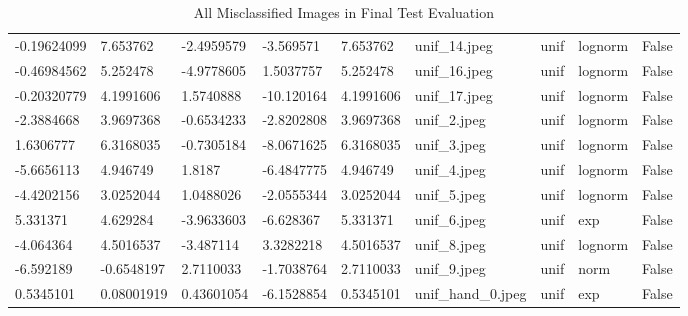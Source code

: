 \documentclass[12pt]{article}
\begin{document}
\begin{table}
{\begin{tabular}{l | l | l | l | l | l | l | l | l}
                        -0.19624099 & 7.653762    & -2.4959579   & -3.569571  & 7.653762  & unif\_14.jpeg      & unif    & lognorm & False      \\
                        -0.46984562 & 5.252478    & -4.9778605   & 1.5037757  & 5.252478  & unif\_16.jpeg      & unif    & lognorm & False      \\
                        -0.20320779 & 4.1991606   & 1.5740888    & -10.120164 & 4.1991606 & unif\_17.jpeg      & unif    & lognorm & False      \\
                        -2.3884668  & 3.9697368   & -0.6534233   & -2.8202808 & 3.9697368 & unif\_2.jpeg       & unif    & lognorm & False      \\
                        1.6306777   & 6.3168035   & -0.7305184   & -8.0671625 & 6.3168035 & unif\_3.jpeg       & unif    & lognorm & False      \\
                        -5.6656113  & 4.946749    & 1.8187       & -6.4847775 & 4.946749  & unif\_4.jpeg       & unif    & lognorm & False      \\
                        -4.4202156  & 3.0252044   & 1.0488026    & -2.0555344 & 3.0252044 & unif\_5.jpeg       & unif    & lognorm & False      \\
                        5.331371    & 4.629284    & -3.9633603   & -6.628367  & 5.331371  & unif\_6.jpeg       & unif    & exp     & False      \\
                        -4.064364   & 4.5016537   & -3.487114    & 3.3282218  & 4.5016537 & unif\_8.jpeg       & unif    & lognorm & False      \\
                        -6.592189   & -0.6548197  & 2.7110033    & -1.7038764 & 2.7110033 & unif\_9.jpeg       & unif    & norm    & False      \\
                        0.5345101   & 0.08001919  & 0.43601054   & -6.1528854 & 0.5345101 & unif\_hand\_0.jpeg & unif    & exp     & False      \\
                        \hline   
                
                    \end{tabular}
                    
                }

                \caption{All Misclassified Images in Final Test Evaluation}
                \label{all-mis-test-eval}

            \end{table}
            
\end{document}
